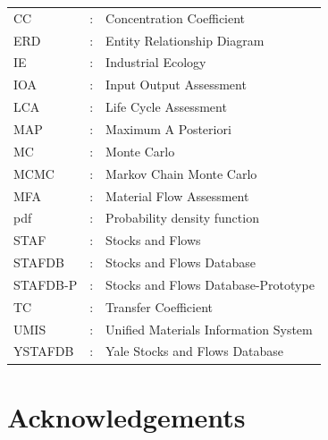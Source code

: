 \documentclass[ %
                    author={Tom Jager},
                supervisor={Dr. Daniel Schien},
                    degree={MEng},
                     title={A Bayesian Inference Engine for Calibrating Uncertainty over UMIS Structured MFA Systems},
                  subtitle={},
                      type={research},
                      year={2019} ]{dissertation}
\begin{document}
\noindent
\begin{tabular}{lcl}
CC                 &:     & Concentration Coefficient
  \\
ERD                &:     & Entity Relationship Diagram
   \\
IE                 &:     & Industrial Ecology                                         \\
IOA                &:     & Input Output Assessment
  \\
LCA                &:     & Life Cycle Assessment
  \\
MAP                &:     & Maximum A Posteriori
 \\
MC             &:      &  Monte Carlo
  \\
MCMC             &:      &  Markov Chain Monte Carlo
  \\
MFA                &:     & Material Flow Assessment
  \\
pdf             &:       & Probability density function
 \\
STAF               &:     & Stocks and Flows
 \\
STAFDB             &:      &  Stocks and Flows Database
  \\
  STAFDB-P             &:      &  Stocks and Flows Database-Prototype
  \\
TC                 &:     & Transfer Coefficient
 \\
UMIS               &:     & Unified Materials Information System
  \\

YSTAFDB            &:     & Yale Stocks and Flows Database
  \\

\end{tabular}



\chapter*{Acknowledgements}

\end{document}

